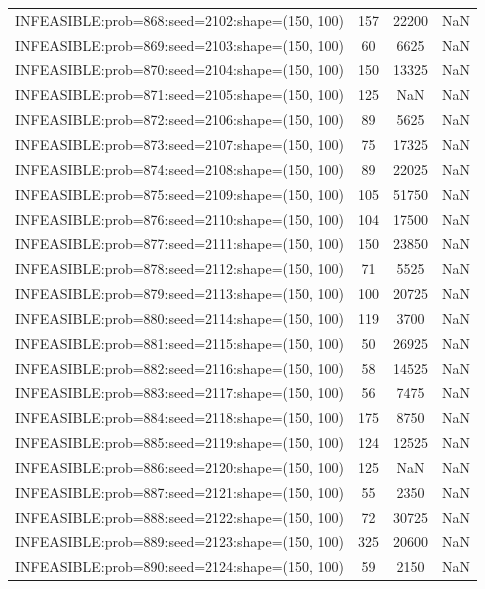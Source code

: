 \begin{longtable}{lccc}
INFEASIBLE:prob=868:seed=2102:shape=(150, 100) &   157 & 22200 &    NaN \\
INFEASIBLE:prob=869:seed=2103:shape=(150, 100) &    60 &  6625 &    NaN \\
INFEASIBLE:prob=870:seed=2104:shape=(150, 100) &   150 & 13325 &    NaN \\
INFEASIBLE:prob=871:seed=2105:shape=(150, 100) &   125 &   NaN &    NaN \\
INFEASIBLE:prob=872:seed=2106:shape=(150, 100) &    89 &  5625 &    NaN \\
INFEASIBLE:prob=873:seed=2107:shape=(150, 100) &    75 & 17325 &    NaN \\
INFEASIBLE:prob=874:seed=2108:shape=(150, 100) &    89 & 22025 &    NaN \\
INFEASIBLE:prob=875:seed=2109:shape=(150, 100) &   105 & 51750 &    NaN \\
INFEASIBLE:prob=876:seed=2110:shape=(150, 100) &   104 & 17500 &    NaN \\
INFEASIBLE:prob=877:seed=2111:shape=(150, 100) &   150 & 23850 &    NaN \\
INFEASIBLE:prob=878:seed=2112:shape=(150, 100) &    71 &  5525 &    NaN \\
INFEASIBLE:prob=879:seed=2113:shape=(150, 100) &   100 & 20725 &    NaN \\
INFEASIBLE:prob=880:seed=2114:shape=(150, 100) &   119 &  3700 &    NaN \\
INFEASIBLE:prob=881:seed=2115:shape=(150, 100) &    50 & 26925 &    NaN \\
INFEASIBLE:prob=882:seed=2116:shape=(150, 100) &    58 & 14525 &    NaN \\
INFEASIBLE:prob=883:seed=2117:shape=(150, 100) &    56 &  7475 &    NaN \\
INFEASIBLE:prob=884:seed=2118:shape=(150, 100) &   175 &  8750 &    NaN \\
INFEASIBLE:prob=885:seed=2119:shape=(150, 100) &   124 & 12525 &    NaN \\
INFEASIBLE:prob=886:seed=2120:shape=(150, 100) &   125 &   NaN &    NaN \\
INFEASIBLE:prob=887:seed=2121:shape=(150, 100) &    55 &  2350 &    NaN \\
INFEASIBLE:prob=888:seed=2122:shape=(150, 100) &    72 & 30725 &    NaN \\
INFEASIBLE:prob=889:seed=2123:shape=(150, 100) &   325 & 20600 &    NaN \\
INFEASIBLE:prob=890:seed=2124:shape=(150, 100) &    59 &  2150 &    NaN \\

\end{longtable}

